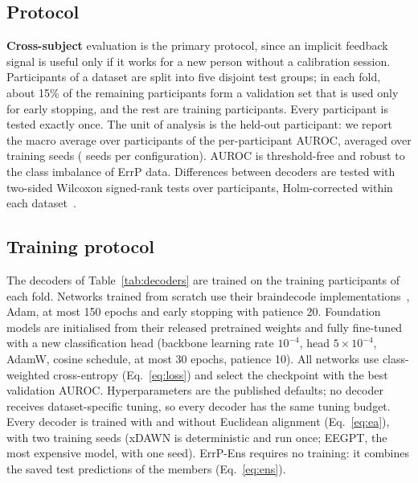 \subsection{Protocol}
\textbf{Cross-subject} evaluation is the primary protocol, since an implicit feedback signal is useful only if it
works for a new person without a calibration session. Participants of a dataset are split into five disjoint
test groups; in each fold, about 15\% of the remaining participants form a validation set that is used only for
early stopping, and the rest are training participants. Every participant is tested exactly once. The unit of
analysis is the held-out participant: we report the macro average over participants of the per-participant
AUROC, averaged over training seeds (\NSeedsMain{} seeds per configuration). AUROC is threshold-free and robust to
the class imbalance of ErrP data. Differences between decoders are tested with two-sided Wilcoxon signed-rank
tests over participants, Holm-corrected within each dataset~\citep{demsar2006statistical}.

\subsection{Training protocol}
The decoders of Table~\ref{tab:decoders} are trained on the training participants of each fold.
Networks trained from scratch use their braindecode implementations~\citep{schirrmeister2017deep}, Adam,
at most 150 epochs and early stopping with patience 20. Foundation models are initialised from their released
pretrained weights and fully fine-tuned with a new classification head (backbone learning rate $10^{-4}$, head
$5\times10^{-4}$, AdamW, cosine schedule, at most 30 epochs, patience 10). All networks use class-weighted
cross-entropy (Eq.~\ref{eq:loss}) and select the checkpoint with the best validation AUROC. Hyperparameters are
the published defaults; no decoder receives dataset-specific tuning, so every decoder has the same tuning budget.
Every decoder is trained with and without Euclidean alignment (Eq.~\ref{eq:ea}), with two training seeds
(xDAWN is deterministic and run once; EEGPT, the most expensive model, with one seed). ErrP-Ens requires no
training: it combines the saved test predictions of the members (Eq.~\ref{eq:ens}).
